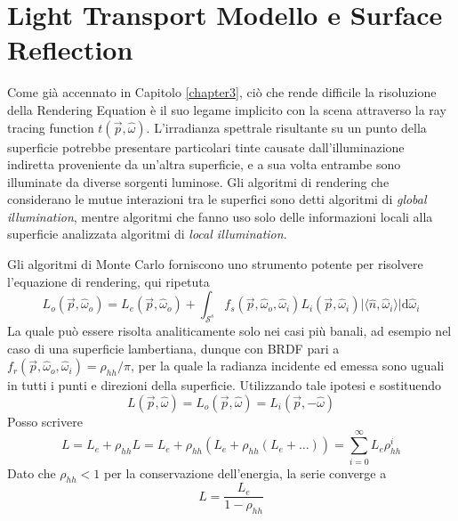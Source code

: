 \chapter{Light Transport Modello e Surface Reflection}\label{chapter8}
Come gi\`a accennato in Capitolo \ref{chapter3}, ci\`o che rende difficile la risoluzione della Rendering Equation \`e il suo legame implicito con
la scena attraverso la ray tracing function $t(\vec{p}, \hat{\omega})$. L'irradianza spettrale risultante su un punto della superficie potrebbe 
presentare particolari tinte causate dall'illuminazione indiretta proveniente da un'altra superficie, e a sua volta entrambe sono illuminate da 
diverse sorgenti luminose. Gli algoritmi di rendering che considerano le mutue interazioni tra le superfici sono detti algoritmi di 
\textit{global illumination}, mentre algoritmi che fanno uso solo delle informazioni locali alla superficie analizzata algoritmi di 
\textit{local illumination}.\par
Gli algoritmi di Monte Carlo forniscono uno strumento potente per risolvere l'equazione di rendering, qui ripetuta
\begin{equation*}
	L_o(\vec{p},\hat{\omega}_o)=L_e(\vec{p},\hat{\omega}_o)+\int_{\mathcal{S}^s}f_s(\vec{p},\hat{\omega}_o,\hat{\omega}_i)L_i(\vec{p},\hat{\omega}_i)%
		\vert\langle\hat{n},\hat{\omega}_i\rangle\vert\mathrm{d}\hat{\omega}_i
\end{equation*}
La quale pu\`o essere risolta analiticamente solo nei casi pi\`u banali, ad esempio nel caso di una superficie lambertiana, dunque con BRDF pari a 
\mbox{$f_r(\vec{p},\hat{\omega}_o,\hat{\omega}_i)=\rho_{hh}/\pi$}, per la quale la radianza 
incidente ed emessa sono uguali in tutti i punti e direzioni della superficie. Utilizzando tale ipotesi e sostituendo 
\begin{equation*}
	L(\vec{p},\hat{\omega})=L_o(\vec{p},\hat{\omega})=L_i(\vec{p},-\hat{\omega})
\end{equation*}
Posso scrivere
\begin{equation}
	L=L_e+\rho_{hh}L=L_e+\rho_{hh}(L_e+\rho_{hh}(L_e+\ldots))=\sum_{i=0}^\infty L_e\rho_{hh}^i
\end{equation}
Dato che $\rho_{hh}<1$ per la conservazione dell'energia, la serie converge a 
\begin{equation}
	L=\frac{L_e}{1-\rho_{hh}}
\end{equation}
